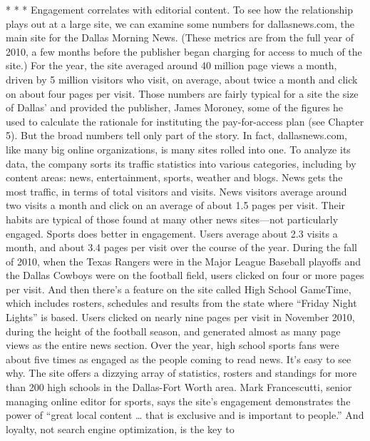 * * *
Engagement correlates with editorial content. To see how the relationship plays
out at a large site, we can examine some numbers for dallasnews.com, the main
site for the Dallas Morning News. (These metrics are from the full year of 2010,
a few months before the publisher began charging for access to much of the site.)
For the year, the site averaged around 40 million page views a month, driven
by 5 million visitors who visit, on average, about twice a month and click on
about four pages per visit. Those numbers are fairly typical for a site the size of
Dallas' and provided the publisher, James Moroney, some of the figures he used
to calculate the rationale for instituting the pay-for-access plan (see Chapter 5).
But the broad numbers tell only part of the story. In fact, dallasnews.com, like
many big online organizations, is many sites rolled into one. To analyze its data,
the company sorts its traffic statistics into various categories, including by content
areas: news, entertainment, sports, weather and blogs.
News gets the most traffic, in terms of total visitors and visits. News visitors
average around two visits a month and click on an average of about 1.5 pages
per visit. Their habits are typical of those found at many other news sites—not
particularly engaged.
Sports does better in engagement. Users average about 2.3 visits a month, and
about 3.4 pages per visit over the course of the year. During the fall of 2010,
when the Texas Rangers were in the Major League Baseball playoffs and the
Dallas Cowboys were on the football field, users clicked on four or more pages
per visit.
And then there's a feature on the site called High School GameTime, which
includes rosters, schedules and results from the state where ``Friday Night Lights''
is based. Users clicked on nearly nine pages per visit in November 2010, during
the height of the football season, and generated almost as many page views as the
entire news section. Over the year, high school sports fans were about five times
as engaged as the people coming to read news.
It's easy to see why. The site offers a dizzying array of statistics, rosters and
standings for more than 200 high schools in the Dallas-Fort Worth area. Mark
Francescutti, senior managing online editor for sports, says the site's engagement
demonstrates the power of ``great local content … that is exclusive and is
important to people.'' And loyalty, not search engine optimization, is the key to
